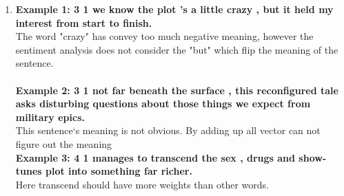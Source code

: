 \documentclass[10pt]{article}
\begin{document}
\begin{enumerate}[label=(\alph*)]
\item
\textbf{Example 1: 3	1	we know the plot 's a little crazy , but it held my interest from start to finish.}\\
The word "crazy" has convey too much negative meaning,
however the sentiment analysis does not consider the "but" which flip the meaning of the sentence.\\
\\\textbf{Example 2: 3	1	not far beneath the surface , this reconfigured tale asks disturbing questions about those things we expect from military epics.}\\
This sentence`s meaning is not obvious. By adding up all vector can not figure out the meaning
\\\textbf{Example 3: 4 1	manages to transcend the sex , drugs and show-tunes plot into something far richer.}\\
Here transcend should have more weights than other words.
\end{enumerate}
\end{document}
